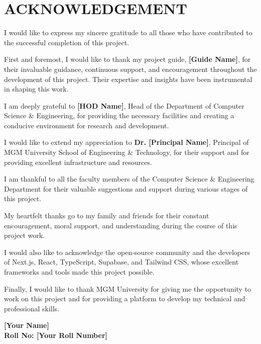 \chapter*{ACKNOWLEDGEMENT}

I would like to express my sincere gratitude to all those who have contributed to the successful completion of this project.

First and foremost, I would like to thank my project guide, \textbf{[Guide Name]}, for their invaluable guidance, continuous support, and encouragement throughout the development of this project. Their expertise and insights have been instrumental in shaping this work.

I am deeply grateful to \textbf{[HOD Name]}, Head of the Department of Computer Science \& Engineering, for providing the necessary facilities and creating a conducive environment for research and development.

I would like to extend my appreciation to \textbf{Dr. [Principal Name]}, Principal of MGM University School of Engineering \& Technology, for their support and for providing excellent infrastructure and resources.

I am thankful to all the faculty members of the Computer Science \& Engineering Department for their valuable suggestions and support during various stages of this project.

My heartfelt thanks go to my family and friends for their constant encouragement, moral support, and understanding during the course of this project work.

I would also like to acknowledge the open-source community and the developers of Next.js, React, TypeScript, Supabase, and Tailwind CSS, whose excellent frameworks and tools made this project possible.

Finally, I would like to thank MGM University for giving me the opportunity to work on this project and for providing a platform to develop my technical and professional skills.

\vspace{2cm}

\begin{flushright}
\textbf{[Your Name]}\\
\textbf{Roll No: [Your Roll Number]}
\end{flushright}

\newpage
